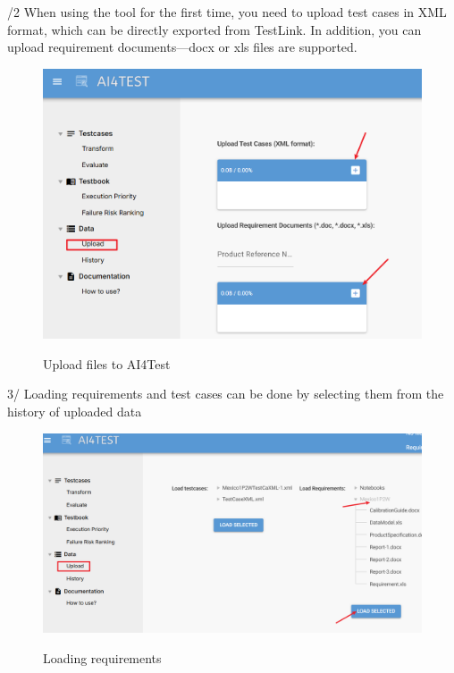 /2  When using the tool for the first time, you need to upload test cases in XML format, which can be directly exported from TestLink. In addition, you can upload requirement documents—docx or xls files are supported.

\begin{figure}[H]
    \begin{center}
        \includegraphics[width=.95\linewidth]{res/ai4test-uploa.png}\\
        \caption{Upload files to AI4Test}\label{ai4test-uploa}
    \end{center}
\end{figure}

3/  Loading requirements and test cases can be done by selecting them from the history of uploaded data

\begin{figure}[H]
    \begin{center}
        \includegraphics[width=.95\linewidth]{res/ai4test-history1.png}\\
        \caption{Loading requirements}\label{ai4test-history1}
    \end{center}
\end{figure}

